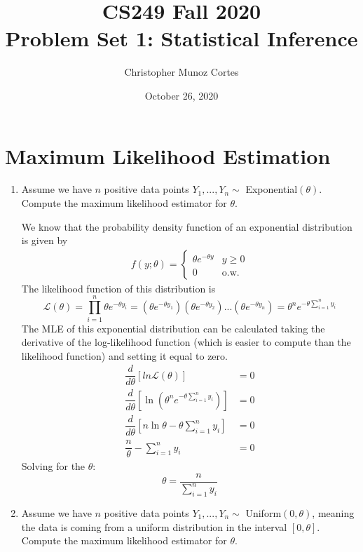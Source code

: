 \documentclass{article}
\title{CS249 Fall 2020\\
       Problem Set 1: Statistical Inference}
\author{Christopher Munoz Cortes}
\date{October 26, 2020}
\begin{document}
\maketitle

\section{Maximum Likelihood Estimation}
\begin{enumerate}[label={(\alph*)}]
    \item Assume we have $n$ positive data points $Y_1,...,Y_n \sim$
    Exponential$(\theta)$. Compute the maximum likelihood estimator for $\theta$.
    
    We know that the probability density function of an exponential 
    distribution is given by
    \begin{align*}
        f(y;\theta) =
        \begin{cases}
            \theta e^{-\theta y} & y \geq 0 \\
            0 & \text{o.w.}
        \end{cases}
    \end{align*}
    The likelihood function of this distribution is
    \[
        \mathcal{L}(\theta) = \prod_{i=1}^{n} \theta e^{-\theta y_i} = 
        \left(\theta e^{-\theta y_1}\right) \left(\theta e^{-\theta  
        y_2}\right) ...\left(\theta e^{-\theta y_n}\right) =
        \theta^n e^{-\theta\sum_{i=1}^{n}y_i}
    \]
    The MLE of this exponential distribution can be calculated taking the 
    derivative of the log-likelihood function (which is easier to compute 
    than the likelihood function) and setting it equal to zero.
    \begin{align*}
        \dfrac{d}{d\theta}\left[ln{\mathcal{L}(\theta)}\right]  &= 0 \\
        \dfrac{d}{d\theta} \left[\ln{\left(\theta^n e^{-\theta \sum_{i=1}^{n}
        y_i}\right)}\right]  &= 0 \\
        \dfrac{d}{d\theta}\left[n\ln{\theta} - \theta \sum_{i=1}^{n} 
        y_i\right] &= 0 \\
        \dfrac{n}{\theta} - \sum_{i=1}^{n}y_i &= 0
    \end{align*}
    Solving for the $\theta$:
    \begin{equation*}
        \boxed{\theta = \dfrac{n}{\sum_{i=1}^{n} y_i}}
    \end{equation*}
    \item Assume we have $n$ positive data points $Y_1,...,Y_n \sim$ 
    Uniform$(0, \theta)$, meaning the data is coming from a uniform distribution in the 
    interval $[0,\theta]$. Compute the maximum likelihood estimator for $\theta$.
    

\end{enumerate}
\end{document}
